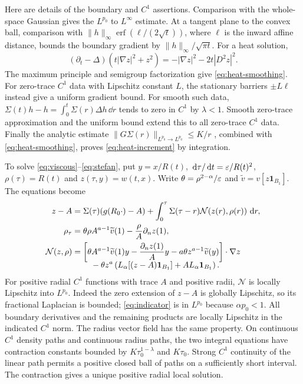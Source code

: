 Here are details of the boundary and $C^1$ assertions. Comparison with the
whole-space Gaussian gives the $L^{p_0}$ to $L^\infty$ estimate. At a tangent
plane to the convex ball, comparison with
$\|h\|_\infty\operatorname{erf}(\ell/(2\sqrt t))$, where $\ell$ is the
inward affine distance, bounds the boundary gradient by
$\|h\|_\infty/\sqrt{\pi t}$. For a heat solution,
\[
 (\partial_t-\Delta)(t|\nabla z|^2+z^2)
 =-|\nabla z|^2-2t|D^2z|^2.
\]
The maximum principle and semigroup factorization give
\eqref{eq:heat-smoothing}. For zero-trace $C^1$ data with Lipschitz constant
$L$, the stationary barriers $\pm L\ell$ instead give a uniform gradient
bound. For smooth such data,
$\Sigma(t)h-h=\int_0^t\Sigma(r)\Delta h\,\dd r$ tends to zero in $C^1$
by $\lambda<1$. Smooth zero-trace approximation and the uniform bound
extend this to all zero-trace $C^1$ data. Finally the analytic estimate
$\|G\Sigma(r)\|_{L^{p_0}\to L^{p_0}}\leq K/r$
\cite[Theorem~1.2.3]{Lunardi2004}, combined with
\eqref{eq:heat-smoothing}, proves \eqref{eq:heat-increment} by integration.

To solve \eqref{eq:viscous}--\eqref{eq:stefan}, put
$y=x/R(t)$, $\,\mathrm d\tau/\,\mathrm d t=\varepsilon/R(t)^2$, $\rho(\tau)=R(t)$ and
$z(\tau,y)=w(t,x)$. Write
$\theta=\rho^{2-\alpha}/\varepsilon$ and
$\widetilde v=v[z\mathbf1_{B_1}]$. The equations become
\begin{align}
 z- A&=\Sigma(\tau)(g(R_0\cdot)-A)
       +\int_0^\tau\Sigma(\tau-r)\mathcal N(z(r),\rho(r))\,\,\mathrm d r,
                                                        \label{eq:mild}\\
 \rho_\tau&=\theta\rho A^{a-1}\widetilde v(1)
              -\frac\rho A\partial_nz(1),\label{eq:rho}\\
 \mathcal N(z,\rho)&=
 \left[\theta A^{a-1}\widetilde v(1)y
 -\frac{\partial_nz(1)}A y-a\theta z^{a-1}\widetilde v(y)\right]\cdot\nabla z
 \nonumber\\[-2mm]
 &\hspace{8mm}-\theta z^a
 \left(L_\alpha[(z-A)\mathbf1_{B_1}]+A L_\alpha\mathbf1_{B_1}\right).
                                                        \label{eq:forcing}
\end{align}
For positive radial $C^1$ functions with trace $A$ and positive radii,
$\mathcal N$ is locally Lipschitz into $L^{p_0}$. Indeed the zero extension
of $z-A$ is globally Lipschitz, so its fractional Laplacian is bounded;
\eqref{eq:indicator} is in $L^{p_0}$ because $\alpha p_0<1$.
All boundary derivatives and the remaining products are locally Lipschitz
in the indicated $C^1$ norm. The radius vector field has the same property.
On continuous $C^1$ density paths and continuous radius paths, the two
integral equations have contraction constants bounded by
$K\tau_0^{1-\lambda}$ and $K\tau_0$. Strong $C^1$ continuity of the linear
path permits a positive closed ball of paths on a sufficiently short
interval. The contraction gives a unique positive radial local solution.

